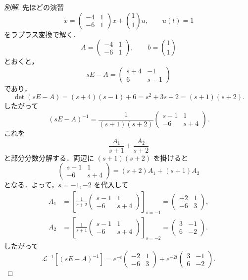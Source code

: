\documentclass[article,paper=a4paper]{jlreq}
\begin{document}
\begin{proof}[別解]
先ほどの演習
\[
  \dot{x}
    =
    \begin{pmatrix}
      -4 & 1\\
      -6 & 1
    \end{pmatrix}x
    +
    \binom{1}{1}u,
  \qquad
  u(t)=1
\]
をラプラス変換で解く．
\[
  A=
  \begin{pmatrix}
    -4 & 1\\
    -6 & 1
  \end{pmatrix},
  \qquad
  b=\binom{1}{1}
\]
とおくと，
\[
  sE-A
    =
    \begin{pmatrix}
      s+4 & -1\\
      6 & s-1
    \end{pmatrix}
\]
であり，
\[
  \det(sE-A)
    =(s+4)(s-1)+6
    =s^2+3s+2
    =(s+1)(s+2).
\]
したがって
\[
  (sE-A)^{-1}
    =
    \frac{1}{(s+1)(s+2)}
    \begin{pmatrix}
      s-1 & 1\\
      -6 & s+4
    \end{pmatrix}.
\]
これを
\[
  \frac{A_1}{s+1}+\frac{A_2}{s+2}
\]
と部分分数分解する．両辺に $(s+1)(s+2)$ を掛けると
\[
  \begin{pmatrix}
    s-1 & 1\\
    -6 & s+4
  \end{pmatrix}
    =
    (s+2)A_1+(s+1)A_2
\]
となる．よって，$s=-1,-2$ を代入して
\begin{align*}
  A_1
    &=
    \left[
      \frac{1}{s+2}
      \begin{pmatrix}
        s-1 & 1\\
        -6 & s+4
      \end{pmatrix}
    \right]_{s=-1}
     =
    \begin{pmatrix}
      -2 & 1\\
      -6 & 3
    \end{pmatrix},\\
  A_2
    &=
    \left[
      \frac{1}{s+1}
      \begin{pmatrix}
        s-1 & 1\\
        -6 & s+4
      \end{pmatrix}
    \right]_{s=-2}
     =
    \begin{pmatrix}
      3 & -1\\
      6 & -2
    \end{pmatrix}.
\end{align*}
したがって
\[
  \mathcal{L}^{-1}\!\left[(sE-A)^{-1}\right]
    =
    e^{-t}
    \begin{pmatrix}
      -2 & 1\\
      -6 & 3
    \end{pmatrix}
    +
    e^{-2t}
    \begin{pmatrix}
      3 & -1\\
      6 & -2
    \end{pmatrix}.
\]


\end{proof}
\end{document}

